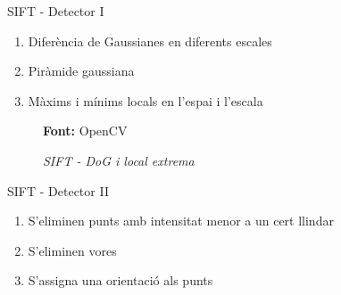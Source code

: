 \documentclass[xcolor=table, 11pt]{beamer}
\newcommand*{\captionsource}[2]{%
  \caption[{#1}]{#1}\par
  \vspace{-0.4cm}
  \tiny{\textbf{Font:} #2\par}}
\newcommand\tz{\fontsize{13}{15.6}\selectfont}
\begin{document}
	\begin{frame}{SIFT - Detector I}
		\tz
		\begin{enumerate}
			\item{Diferència de Gaussianes en diferents escales}
			\item{Piràmide gaussiana}
			\item{Màxims i mínims locals en l'espai i l'escala}
			\setcounter{enumTemp}{\theenumi}
		\end{enumerate}
		\begin{figure}[H]
			\captionsource{\textit{SIFT - DoG i \textit{local extrema}}}{OpenCV}
		\end{figure}
	\end{frame}

	\begin{frame}{SIFT - Detector II}
		\tz
		\begin{enumerate}
			\setcounter{enumi}{\theenumTemp}
			\item{S'eliminen punts amb intensitat menor a un cert llindar}
			\item{S'eliminen vores}
			\item{S'assigna una orientació als punts}
		\end{enumerate}
	\end{frame}
\end{document}
